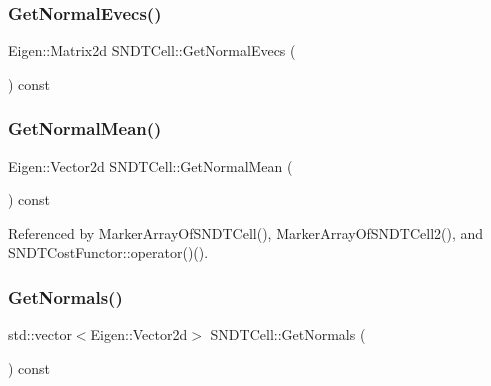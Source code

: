 \mbox{\label{classSNDTCell_a030b5ddd00d4e1aea413081fc52aa5b4}} 
\subsubsection{\texorpdfstring{Get\+Normal\+Evecs()}{GetNormalEvecs()}}
{\footnotesize\ttfamily Eigen\+::\+Matrix2d S\+N\+D\+T\+Cell\+::\+Get\+Normal\+Evecs (\begin{DoxyParamCaption}{ }\end{DoxyParamCaption}) const\hspace{0.3cm}{\ttfamily [inline]}}

\mbox{\label{classSNDTCell_a7d8e809d38f44a7f2d0efe44af390680}} 
\subsubsection{\texorpdfstring{Get\+Normal\+Mean()}{GetNormalMean()}}
{\footnotesize\ttfamily Eigen\+::\+Vector2d S\+N\+D\+T\+Cell\+::\+Get\+Normal\+Mean (\begin{DoxyParamCaption}{ }\end{DoxyParamCaption}) const\hspace{0.3cm}{\ttfamily [inline]}}



Referenced by Marker\+Array\+Of\+S\+N\+D\+T\+Cell(), Marker\+Array\+Of\+S\+N\+D\+T\+Cell2(), and S\+N\+D\+T\+Cost\+Functor\+::operator()().

\mbox{\label{classSNDTCell_ad8fbc8a667577b4c3d8c697f4fe6187b}} 
\subsubsection{\texorpdfstring{Get\+Normals()}{GetNormals()}}
{\footnotesize\ttfamily std\+::vector$<$Eigen\+::\+Vector2d$>$ S\+N\+D\+T\+Cell\+::\+Get\+Normals (\begin{DoxyParamCaption}{ }\end{DoxyParamCaption}) const\hspace{0.3cm}{\ttfamily [inline]}}

